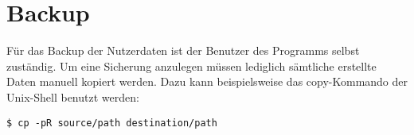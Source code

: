 
\section{Backup}

Für das Backup der Nutzerdaten ist der Benutzer des Programms selbst zuständig. Um eine Sicherung anzulegen müssen lediglich sämtliche erstellte Daten manuell kopiert werden. Dazu kann beispielsweise das copy-Kommando der Unix-Shell benutzt werden:
\begin{lstlisting}[style=Bash]
$ cp -pR source/path destination/path
\end{lstlisting}
